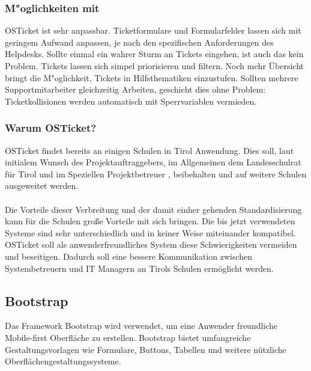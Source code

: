 	\subsubsection{M"oglichkeiten mit \getOst}
	
	OSTicket ist sehr anpassbar. Ticketformulare und Formularfelder lassen sich mit geringem Aufwand anpassen, je nach den spezifischen Anforderungen des Helpdesks. Sollte einmal ein wahrer Sturm an Tickets eingehen, ist auch das kein Problem. Tickets lassen sich simpel priorisieren und filtern. Noch mehr Übersicht bringt die M"oglichkeit, Tickets in Hilfsthematiken einzustufen. Sollten mehrere Supportmitarbeiter gleichzeitig Arbeiten, geschieht dies ohne Problem: Ticketkollisionen werden automatisch mit Sperrvariablen vermieden.
	
	\subsubsection{Warum OSTicket?}
	OSTicket findet bereits an einigen Schulen in Tirol Anwendung. Dies soll, laut initialem Wunsch des Projektauftraggebers, im Allgemeinen dem Landesschulrat für Tirol und im Speziellen Projektbetreuer \getHammerl , beibehalten und auf weitere Schulen ausgeweitet werden.
	\paragraph{}
	Die Vorteile dieser Verbreitung und der damit einher gehenden Standardisierung kann für die Schulen große Vorteile mit sich bringen. Die bis jetzt verwendeten Systeme sind sehr unterschiedlich und in keiner Weise miteinander kompatibel. OSTicket soll als anwenderfreundliches System diese Schwierigkeiten vermeiden und beseitigen. Dadurch soll eine bessere Kommunikation zwischen Systembetreuern und IT Managern an Tirols Schulen ermöglicht werden.

	\subsection{Bootstrap} \label{Bootstrap}
	Das Framework Bootstrap wird verwendet, um eine Anwender freundliche Mobile-first Oberfläche zu erstellen. Bootstrap bietet umfangreiche Gestaltungsvorlagen wie Formulare, Buttons, Tabellen und weitere nützliche Oberflächengestaltungssysteme.
	
